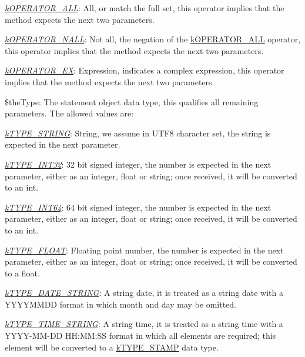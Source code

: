 \begin{DoxyItemize}
\begin{DoxyItemize}
\item {\itshape \hyperlink{}{k\-O\-P\-E\-R\-A\-T\-O\-R\-\_\-\-A\-L\-L}}\-: All, or match the full set, this operator implies that the method expects the next two parameters. 
\item {\itshape \hyperlink{}{k\-O\-P\-E\-R\-A\-T\-O\-R\-\_\-\-N\-A\-L\-L}}\-: Not all, the negation of the \hyperlink{}{k\-O\-P\-E\-R\-A\-T\-O\-R\-\_\-\-A\-L\-L} operator, this operator implies that the method expects the next two parameters. 
\item {\itshape \hyperlink{}{k\-O\-P\-E\-R\-A\-T\-O\-R\-\_\-\-E\-X}}\-: Expression, indicates a complex expression, this operator implies that the method expects the next two parameters. 
\end{DoxyItemize}
\item {\ttfamily \$the\-Type}\-: The statement object data type, this qualifies all remaining parameters. The allowed values are\-: 
\begin{DoxyItemize}
\item {\itshape \hyperlink{}{k\-T\-Y\-P\-E\-\_\-\-S\-T\-R\-I\-N\-G}}\-: String, we assume in U\-T\-F8 character set, the string is expected in the next parameter. 
\item {\itshape \hyperlink{}{k\-T\-Y\-P\-E\-\_\-\-I\-N\-T32}}\-: 32 bit signed integer, the number is expected in the next parameter, either as an integer, float or string; once received, it will be converted to an {\ttfamily int}. 
\item {\itshape \hyperlink{}{k\-T\-Y\-P\-E\-\_\-\-I\-N\-T64}}\-: 64 bit signed integer, the number is expected in the next parameter, either as an integer, float or string; once received, it will be converted to an {\ttfamily int}. 
\item {\itshape \hyperlink{}{k\-T\-Y\-P\-E\-\_\-\-F\-L\-O\-A\-T}}\-: Floating point number, the number is expected in the next parameter, either as an integer, float or string; once received, it will be converted to a {\ttfamily float}. 
\item {\itshape \hyperlink{}{k\-T\-Y\-P\-E\-\_\-\-D\-A\-T\-E\-\_\-\-S\-T\-R\-I\-N\-G}}\-: A string date, it is treated as a string date with a Y\-Y\-Y\-Y\-M\-M\-D\-D format in which month and day may be omitted. 
\item {\itshape \hyperlink{}{k\-T\-Y\-P\-E\-\_\-\-T\-I\-M\-E\-\_\-\-S\-T\-R\-I\-N\-G}}\-: A string time, it is treated as a string time with a Y\-Y\-Y\-Y-\/\-M\-M-\/\-D\-D H\-H\-:\-M\-M\-:S\-S format in which all elements are required; this element will be converted to a \hyperlink{}{k\-T\-Y\-P\-E\-\_\-\-S\-T\-A\-M\-P} data type. 

\end{DoxyItemize}
\end{DoxyItemize}

